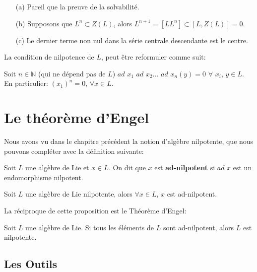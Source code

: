 \documentclass[a4paper,openany,12pt]{report}
\newcommand{\NN}{\mathbb{N}}
\theoremstyle{break}
{\theorembodyfont{\upshape}
\newtheorem*{rmq}{Remarque :}
\newtheorem*{prv}{Preuve :}
\newtheorem*{ex}{Exemples :}
\newtheorem{exe}{Exemple : }
\newtheorem*{nota}{Notation :}}
\begin{document}
\begin{prv}
\begin{itemize}
\item[(a)]  Pareil que la preuve de la solvabilité.
\item[(b)]  Supposons que $L^n\subset Z(L)$, alors $L^{n+1}=[LL^n]\subset [L,Z(L)]=0$.
\item[(c)] Le dernier terme non nul dans la série centrale descendante est le centre.
\end{itemize}
\end{prv}

\begin{rmq}
La condition de nilpotence de $L$, peut être reformuler comme suit:

Soit $n \in \NN$ (qui ne dépend pas de $L$) $ad$ $x_{1}$ $ad$ $x_{2} \ldots$ $ad$ $x_{n}(y)=0$  $\forall$ $x_{i}$, $y \in L$.
En particulier:
$(x_{1})^n=0$, $\forall x \in L$.
\end{rmq}

\chapter{Le théorème d'Engel}

\quad Nous avons vu dans le chapitre précédent la notion d'algèbre nilpotente, que nous pouvons compléter avec la définition suivante:

\begin{df}
\quad Soit $L$ une algèbre de Lie et $x \in L$. On dit que $x$ est \textbf{ad-nilpotent} si $ad$ $x$ est un endomorphisme nilpotent. 
\end{df}

\begin{prop}\label{prop:E1}
\quad Soit $L$ une algèbre de Lie nilpotente, alors $\forall x \in L$, $x$ est ad-nilpotent.
\end{prop}


La réciproque de cette proposition est le Théorème d'Engel:

\begin{thm}\label{thm:engel}
\quad Soit $L$ une algèbre de Lie.
Si tous les éléments de $L$ sont ad-nilpotent, alors $L$ est nilpotente.
\end{thm}

\section{Les Outils}
\end{document}
